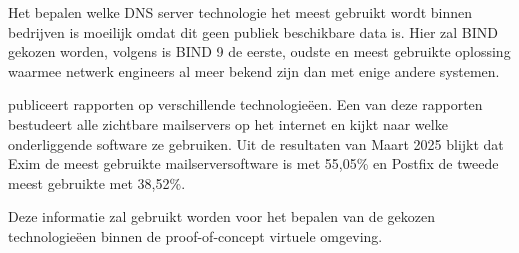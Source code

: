 Het bepalen welke DNS server technologie het meest gebruikt wordt binnen bedrijven is moeilijk omdat dit geen publiek beschikbare data is. Hier zal BIND gekozen worden, volgens \textcite{Bind9} is BIND 9 de eerste, oudste en meest gebruikte oplossing waarmee netwerk engineers al meer bekend zijn dan met enige andere systemen. \break

\textcite{SecSpMail} publiceert rapporten op verschillende technologieëen. Een van deze rapporten bestudeert alle zichtbare mailservers op het internet en kijkt naar welke onderliggende software ze gebruiken. Uit de resultaten van Maart 2025 blijkt dat Exim de meest gebruikte mailserversoftware is met 55,05\% en Postfix de tweede meest gebruikte met 38,52\%. \break

Deze informatie zal gebruikt worden voor het bepalen van de gekozen technologieëen binnen de proof-of-concept virtuele omgeving.

%



